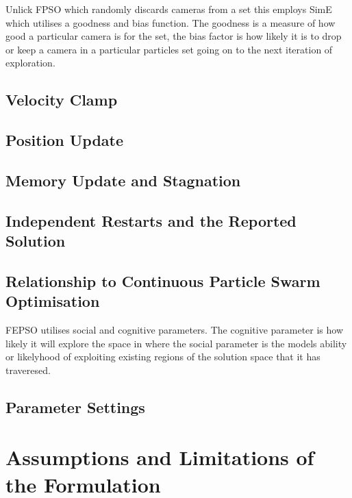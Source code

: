 Unlick FPSO which randomly discards cameras from a set this employs SimE which utilises a goodness and bias function. The goodness is a measure of how good a particular camera is for the set, the bias factor is how likely it is to drop or keep a camera in a particular particles set going on to the next iteration of exploration.

\subsection{Velocity Clamp}

\subsection{Position Update}

\subsection{Memory Update and Stagnation}

\subsection{Independent Restarts and the Reported Solution}

\subsection{Relationship to Continuous Particle Swarm Optimisation}

FEPSO utilises social and cognitive parameters. The cognitive parameter is how likely it will explore the space in where the social parameter is the models ability or likelyhood of exploiting existing regions of the solution space that it has traveresed.

\subsection{Parameter Settings}

\section{Assumptions and Limitations of the Formulation}
\label{sec:formulationlimits}

